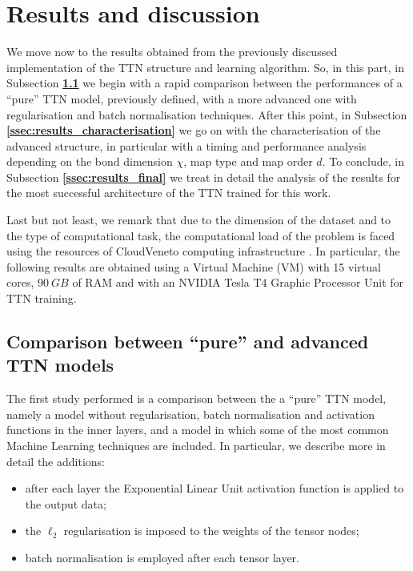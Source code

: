 \documentclass[../main/main.tex]{subfiles}
\begin{document}
\section{Results and discussion}

We move now to the results obtained from the previously discussed implementation of the TTN structure and learning algorithm. So, in this part, in Subsection \textbf{\ref{ssec:results_comparison}} we begin with a rapid comparison between the performances of a ``pure'' TTN model, previously defined, with a more advanced one with regularisation and batch normalisation techniques. After this point, in Subsection \textbf{\ref{ssec:results_characterisation}} we go on with the characterisation of the advanced structure, in particular with a timing and performance analysis depending on the bond dimension \( \chi \), map type and map order \( d \). To conclude, in Subsection \textbf{\ref{ssec:results_final}} we treat in detail the analysis of the results for the most successful architecture of the TTN trained for this work.

Last but not least, we remark that due to the dimension of the dataset and to the type of computational task, the computational load of the problem is faced using the resources of CloudVeneto computing infrastructure \cite{cloudveneto}. In particular, the following results are obtained using a Virtual Machine (VM) with 15 virtual cores, \( 90 \ \si{GB} \) of RAM and with an NVIDIA Tesla T4 Graphic Processor Unit for TTN training.



\subsection{Comparison between ``pure'' and advanced TTN models}
\label{ssec:results_comparison}

The first study performed is a comparison between the a ``pure'' TTN model, namely a model without regularisation, batch normalisation and activation functions in the inner layers, and a model in which some of the most common Machine Learning techniques are included. In particular, we describe more in detail the additions:
\begin{itemize}
    \item after each layer the Exponential Linear Unit activation function is applied to the output data;
    \item the \( \ell_{2} \) regularisation is imposed to the weights of the tensor nodes;
    \item batch normalisation is employed after each tensor layer.
\end{itemize}
\end{document}
